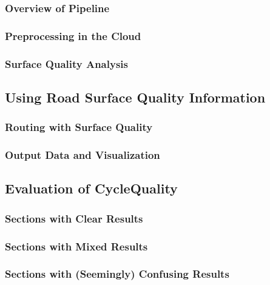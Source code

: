 \subsubsection{Overview of Pipeline}
\label{sec:overview_of_pipeline}

\subsubsection{Preprocessing in the Cloud}
\label{sec:preprocessing_in_the_cloud}

\subsubsection{Surface Quality Analysis}
\label{sec:surface_quality_analysis}


\subsection{Using Road Surface Quality Information}
\label{sec:using_road_surface_quality_information}


\subsubsection{Routing with Surface Quality}
\label{sec:routing_with_surface_quality}

\subsubsection{Output Data and Visualization}
\label{sec:output_data_and_visualization}


\subsection{Evaluation of CycleQuality}
\label{evaluation_cyclequality}


\subsubsection{Sections with Clear Results}
\label{sec:sections_with_clear_results}

\subsubsection{Sections with Mixed Results}
\label{sec:sections_with_mixed_results}

\subsubsection{Sections with (Seemingly) Confusing Results}
\label{sec:sections_with_seemingly_confusing_results}


